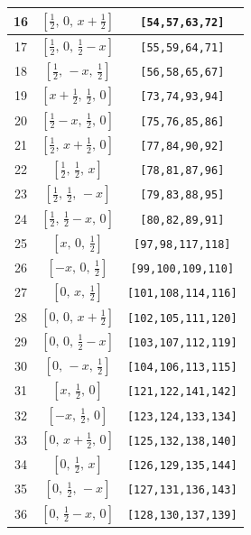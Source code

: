 \documentclass[fleqn,8pt]{jsarticle}
\begin{document}
\begin{longtable}{ccc}
16 & $\left[ \frac{1}{2},\, 0,\, x + \frac{1}{2} \right]$ & {\tt [54,57,63,72]} \\ \hline
17 & $\left[ \frac{1}{2},\, 0,\, \frac{1}{2} - x \right]$ & {\tt [55,59,64,71]} \\ \hline
18 & $\left[ \frac{1}{2},\, - x,\, \frac{1}{2} \right]$ & {\tt [56,58,65,67]} \\ \hline
19 & $\left[ x + \frac{1}{2},\, \frac{1}{2},\, 0 \right]$ & {\tt [73,74,93,94]} \\ \hline
20 & $\left[ \frac{1}{2} - x,\, \frac{1}{2},\, 0 \right]$ & {\tt [75,76,85,86]} \\ \hline
21 & $\left[ \frac{1}{2},\, x + \frac{1}{2},\, 0 \right]$ & {\tt [77,84,90,92]} \\ \hline
22 & $\left[ \frac{1}{2},\, \frac{1}{2},\, x \right]$ & {\tt [78,81,87,96]} \\ \hline
23 & $\left[ \frac{1}{2},\, \frac{1}{2},\, - x \right]$ & {\tt [79,83,88,95]} \\ \hline
24 & $\left[ \frac{1}{2},\, \frac{1}{2} - x,\, 0 \right]$ & {\tt [80,82,89,91]} \\ \hline
25 & $\left[ x,\, 0,\, \frac{1}{2} \right]$ & {\tt [97,98,117,118]} \\ \hline
26 & $\left[ - x,\, 0,\, \frac{1}{2} \right]$ & {\tt [99,100,109,110]} \\ \hline
27 & $\left[ 0,\, x,\, \frac{1}{2} \right]$ & {\tt [101,108,114,116]} \\ \hline
28 & $\left[ 0,\, 0,\, x + \frac{1}{2} \right]$ & {\tt [102,105,111,120]} \\ \hline
29 & $\left[ 0,\, 0,\, \frac{1}{2} - x \right]$ & {\tt [103,107,112,119]} \\ \hline
30 & $\left[ 0,\, - x,\, \frac{1}{2} \right]$ & {\tt [104,106,113,115]} \\ \hline
31 & $\left[ x,\, \frac{1}{2},\, 0 \right]$ & {\tt [121,122,141,142]} \\ \hline
32 & $\left[ - x,\, \frac{1}{2},\, 0 \right]$ & {\tt [123,124,133,134]} \\ \hline
33 & $\left[ 0,\, x + \frac{1}{2},\, 0 \right]$ & {\tt [125,132,138,140]} \\ \hline
34 & $\left[ 0,\, \frac{1}{2},\, x \right]$ & {\tt [126,129,135,144]} \\ \hline
35 & $\left[ 0,\, \frac{1}{2},\, - x \right]$ & {\tt [127,131,136,143]} \\ \hline
36 & $\left[ 0,\, \frac{1}{2} - x,\, 0 \right]$ & {\tt [128,130,137,139]} \\ \hline

\end{longtable}
\end{document}

